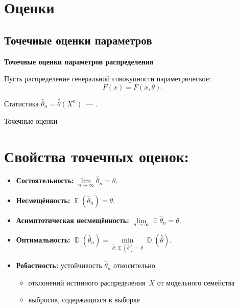 \documentclass[11pt,pdf,utf8,hyperref={unicode},aspectratio=169]{beamer}
\DeclareMathOperator{\DD}{\mathbb{D}}
\DeclareMathOperator{\EE}{\mathbb{E}}
\begin{document}
\section{Оценки}
\subsection{Точечные оценки параметров}
\begin{frame}{}{}
    {\centering
    \bfseries
    \huge Точечные оценки параметров распределения
    \par}
    \bigskip
     Пусть распределение генеральной совокупности параметрическое:
      $$F(x) = F(x,\theta).$$

    Статистика $\hat{\theta}_n = \hat{\theta}\left(X^n\right)$~--- .

\end{frame}
\begin{frame}{Точечные оценки}



    \bigskip

    \section{Свойства точечных оценок:}
    \begin{itemize}
    \item \textbf{Состоятельность:} $\lim\limits_{n\to\infty} \hat{\theta}_n  = \theta$.

    \item \textbf{Несмещённость:} $\EE(\hat{\theta}_n) = \theta$.

    \item \textbf{Асимптотическая несмещённость:} $\lim\limits_{n\to\infty}\EE\hat{\theta}_n = \theta$.

    \item \textbf{Оптимальность:} $\DD(\hat{\theta}_n) = \min\limits_{\hat{\theta}\colon \EE(\hat{\theta})=\theta } \DD(\hat{\theta})$.

    \item \textbf{Робастность:} устойчивость $\hat{\theta}_n$ относительно
    \begin{itemize}
    	\item отклонений истинного распределения~$X$ от модельного семейства
    	\item выбросов, содержащихся в выборке
    \end{itemize}
    \end{itemize}
\end{frame}
\end{document}
